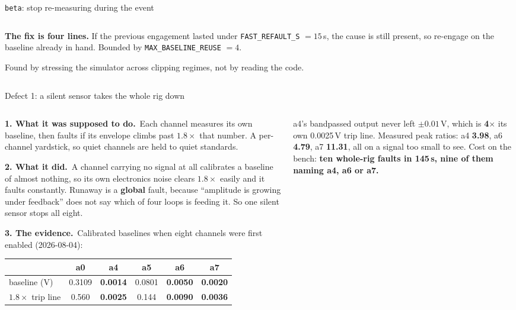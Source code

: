 \documentclass[aspectratio=169]{beamer}
\newcommand{\intended}{\textbf{1. What it was supposed to do.}}
\newcommand{\actual}{\textbf{2. What it did.}}
\newcommand{\evidence}{\textbf{3. The evidence.}}
\begin{document}
\begin{frame}{\texttt{beta}: stop re-measuring during the event}
\begin{columns}[T]
\begin{column}{0.5\textwidth}
      \vspace{2mm}
      \raggedright
      \textbf{The fix is four lines.} If the previous engagement lasted under
      \texttt{FAST\_REFAULT\_S} $= 15$\,s, the cause is still present, so
      re-engage on the baseline already in hand. Bounded by
      \texttt{MAX\_BASELINE\_REUSE} $= 4$.

      \vspace{1mm}
      Found by stressing the simulator across clipping regimes, not by
      reading the code.
    \end{column}
  \end{columns}
\end{frame}

\begin{frame}{Defect 1: a silent sensor takes the whole rig down}
  \begin{columns}[T]
    \begin{column}{0.50\textwidth}
      \footnotesize
      \intended\ Each channel measures its own baseline, then faults if its
      envelope climbs past $1.8\times$ that number. A per-channel yardstick, so
      quiet channels are held to quiet standards.

      \vspace{1.5mm}
      \actual\ A channel carrying no signal at all calibrates a baseline of
      almost nothing, so its own electronics noise clears $1.8\times$ easily and
      it faults constantly. Runaway is a \textbf{global} fault, because
      ``amplitude is growing under feedback'' does not say which of four loops is
      feeding it. So one silent sensor stops all eight.

      \vspace{1.5mm}
      \evidence\ Calibrated baselines when eight channels were first enabled
      (2026-08-04):

      \vspace{1mm}
      \centering
      {\scriptsize\setlength{\tabcolsep}{2.5pt}
      \begin{tabular}{@{}lccccc@{}}
        \toprule
        & a0 & a4 & a5 & a6 & a7 \\
        \midrule
        baseline (V) & 0.3109 & \textbf{0.0014} & 0.0801 & \textbf{0.0050} &
          \textbf{0.0020} \\
        $1.8\times$ trip line & 0.560 & \textbf{0.0025} & 0.144 &
          \textbf{0.0090} & \textbf{0.0036} \\
        \bottomrule
      \end{tabular}}
    \end{column}
    \begin{column}{0.47\textwidth}
      \footnotesize
      a4's bandpassed output never left $\pm 0.01$\,V, which is
      \textbf{4$\times$} its own 0.0025\,V trip line. Measured peak ratios: a4
      \textbf{3.98}, a6 \textbf{4.79}, a7 \textbf{11.31}, all on a signal too
      small to see. Cost on the bench: \alert{\textbf{ten whole-rig faults in
      145\,s, nine of them naming a4, a6 or a7.}}


\end{column}
\end{columns}
\end{frame}
\end{document}
